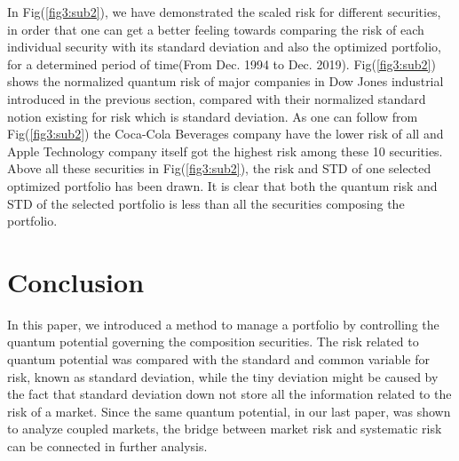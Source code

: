 \documentclass[ aip,jmp,reprint]{revtex4-2}
\begin{document}
 In Fig(\ref{fig3:sub2}), we have demonstrated the scaled risk for different securities, in order that one can get a better feeling towards comparing the risk of each individual security with its standard deviation and also the optimized portfolio, for a determined period of time(From Dec. 1994 to Dec. 2019). Fig(\ref{fig3:sub2}) shows the normalized quantum risk of major companies in Dow Jones industrial introduced in the previous section, compared with their normalized standard notion existing for risk which is standard deviation.  As one can follow from Fig(\ref{fig3:sub2}) the Coca-Cola Beverages company have the lower risk of all and Apple Technology company itself got the highest risk among these 10 securities. Above all these securities in Fig(\ref{fig3:sub2}), the risk and STD of one selected optimized portfolio has been drawn. It is clear that both the quantum risk and STD of the selected portfolio is less than all the securities composing the portfolio. 

\newpage
\section{Conclusion}
In this paper, we introduced a method to manage a portfolio by controlling the quantum potential governing the composition securities. The risk related to quantum potential was compared with the standard and common variable for risk, known as standard deviation, while the tiny deviation might be caused by the fact that standard deviation down not store all the information related to the risk of a market. Since the same quantum potential, in our last paper, was shown to analyze coupled markets, the bridge between market risk and systematic risk can be connected in further analysis. 
\newpage
\end{document}
